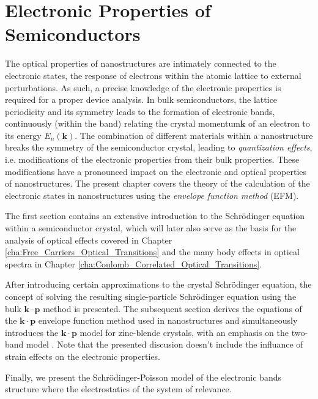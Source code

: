 %

\chapter{Electronic Properties of Semiconductors}

\label{cha:Electronic_Properties_Semiconductors}The optical properties
of nanostructures are intimately connected to the electronic states,
the response of electrons within the atomic lattice to external perturbations.
As such, a precise knowledge of the electronic properties is required
for a proper device analysis. In bulk semiconductors, the lattice
periodicity and its symmetry leads to the formation of electronic
bands, continuously (within the band) relating the crystal momentum$\mathbf{k}$
of an electron to its energy $E_{n}\left(\mathbf{k}\right)$. The
combination of different materials within a nanostructure breaks the
symmetry of the semiconductor crystal, leading to \emph{quantization
effects}, i.e. modifications of the electronic properties from their
bulk properties. These modifications have a pronounced impact on the
electronic and optical properties of nanostructures. The present chapter
covers the theory of the calculation of the electronic states in nanostructures
using the \emph{envelope function method} (EFM). 

The first section contains an extensive introduction to the Schr\"{o}dinger 
equation within a semiconductor crystal, which will later also serve
as the basis for the analysis of optical effects covered in Chapter
\ref{cha:Free_Carriers_Optical_Transitions} and the many body effects
in optical spectra in Chapter \ref{cha:Coulomb_Correlated_Optical_Transitions}. 

After introducing certain approximations to the crystal Schr\"{o}dinger 
equation, the concept of solving the resulting single-particle Schr\"{o}dinger 
equation using the bulk $\mathbf{k\cdot p}$ method is presented.
The subsequent section derives the equations of the $\mathbf{k\cdot p}$
envelope function method used in nanostructures and simultaneously
introduces the $\mathbf{k\cdot p}$ model for zinc-blende crystals,
with an emphasis on the two-band model . Note that the presented discusion
doesn't include the influance of strain effects on the electronic
properties. 

Finally, we present the Schr\"{o}dinger-Poisson model of the electronic
bands structure where the electrostatics of the system of relevance.


